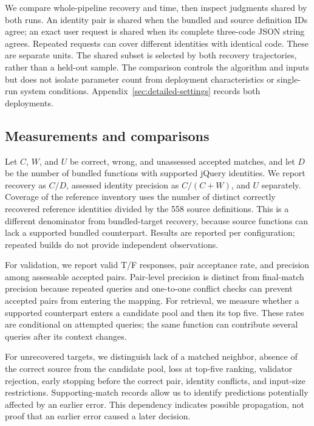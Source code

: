 We compare whole-pipeline recovery and time, then inspect judgments shared by both runs. An identity pair is shared when the bundled and source definition IDs agree; an exact user request is shared when its complete three-code JSON string agrees. Repeated requests can cover different identities with identical code. These are separate units. The shared subset is selected by both recovery trajectories, rather than a held-out sample. The comparison controls the algorithm and inputs but does not isolate parameter count from deployment characteristics or single-run system conditions. Appendix~\ref{sec:detailed-settings} records both deployments.

\subsection{Measurements and comparisons}
Let $C$, $W$, and $U$ be correct, wrong, and unassessed accepted matches, and let $D$ be the number of bundled functions with supported jQuery identities. We report recovery as $C/D$, assessed identity precision as $C/(C+W)$, and $U$ separately. Coverage of the reference inventory uses the number of distinct correctly recovered reference identities divided by the 558 source definitions. This is a different denominator from bundled-target recovery, because source functions can lack a supported bundled counterpart. Results are reported per configuration; repeated builds do not provide independent observations.

For validation, we report valid T/F responses, pair acceptance rate, and precision among assessable accepted pairs. Pair-level precision is distinct from final-match precision because repeated queries and one-to-one conflict checks can prevent accepted pairs from entering the mapping. For retrieval, we measure whether a supported counterpart enters a candidate pool and then its top five. These rates are conditional on attempted queries; the same function can contribute several queries after its context changes.

For unrecovered targets, we distinguish lack of a matched neighbor, absence of the correct source from the candidate pool, loss at top-five ranking, validator rejection, early stopping before the correct pair, identity conflicts, and input-size restrictions. Supporting-match records allow us to identify predictions potentially affected by an earlier error. This dependency indicates possible propagation, not proof that an earlier error caused a later decision.

